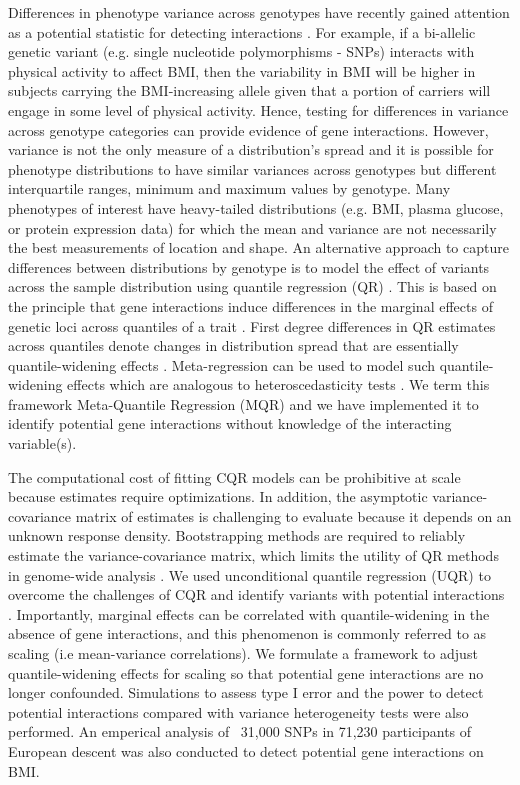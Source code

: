 \documentclass[12pt]{article}
\begin{document}
Differences in phenotype variance across genotypes have recently gained attention as a potential statistic for detecting interactions \cite{struchalin2010variance, sun2013significance, pare2010use,gauderman2013finding}. For example, if a bi-allelic genetic variant (e.g. single nucleotide polymorphisms - SNPs) interacts with physical activity to affect BMI, then the variability in BMI will be higher in subjects carrying the BMI-increasing allele given that a portion of carriers will engage in some level of physical activity. Hence, testing for differences in variance across genotype categories can provide evidence of gene interactions. However, variance  is not the only measure of a distribution's spread and it is possible for phenotype distributions to have similar variances across genotypes but different interquartile ranges, minimum and maximum values by genotype. Many phenotypes of interest have heavy-tailed distributions (e.g. BMI, plasma glucose, or protein expression data) for which the mean and variance are not necessarily the best measurements of location and shape. An alternative approach to capture differences between distributions by genotype is to model the effect of variants across the sample distribution using quantile regression (QR) \cite{koenker1978regression}. This is based on the principle that gene interactions induce differences in the marginal effects of genetic loci across quantiles of a trait  \cite{abadi2017penetrance, koenker1982robust}. First degree differences in QR estimates across quantiles denote changes in distribution spread that are essentially quantile-widening effects \cite{koenker1982robust}. Meta-regression can be used to model such quantile-widening effects which are analogous to heteroscedasticity tests \cite{koenker1982robust, abadi2017penetrance}. We term this framework Meta-Quantile Regression (MQR) and we have implemented it to identify potential gene interactions without knowledge of the interacting variable(s)\cite{abadi2017penetrance}. 

The computational cost of fitting CQR models can be prohibitive at scale because estimates require optimizations. In addition, the asymptotic variance-covariance matrix of estimates is challenging to evaluate because it depends on an unknown response density. Bootstrapping methods are required to reliably estimate the variance-covariance matrix, which limits the utility of QR methods in genome-wide analysis \cite{hagemann2017cluster}. We used unconditional quantile regression (UQR) to overcome the challenges of CQR and identify variants with potential interactions \cite{firpo2009unconditional}. Importantly, marginal effects can be correlated with quantile-widening in the absence of gene interactions, and this phenomenon is commonly referred to as scaling (i.e mean-variance correlations). We formulate a framework to adjust quantile-widening effects for scaling so that potential gene interactions are no longer confounded. Simulations to assess type I error and the power to detect potential interactions compared with variance heterogeneity tests were also performed. An emperical analysis of ~31,000 SNPs in 71,230 participants of European descent was also conducted to detect potential gene interactions on BMI. 
\end{document}
